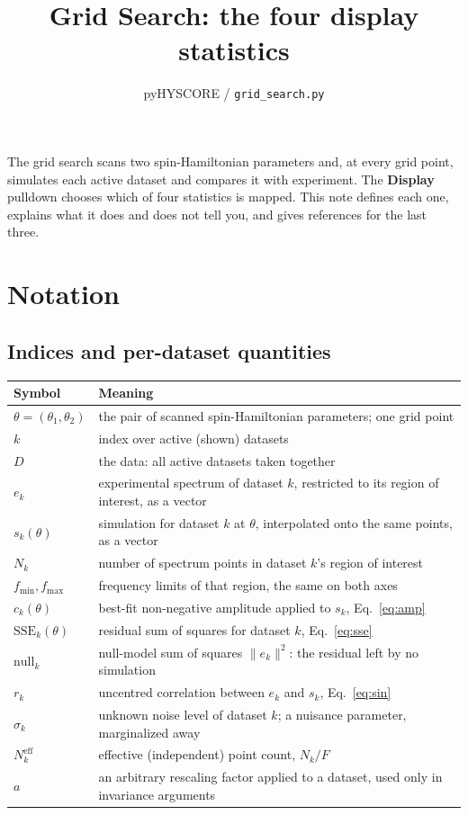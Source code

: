 \documentclass[11pt,a4paper]{article}
\title{Grid Search: the four display statistics}
\author{pyHYSCORE / \texttt{grid\_search.py}}
\date{}
\newcommand{\SSE}{\mathrm{SSE}}
\begin{document}
\maketitle

The grid search scans two spin-Hamiltonian parameters and, at every grid
point, simulates each active dataset and compares it with experiment. The
\textbf{Display} pulldown chooses which of four statistics is mapped. This
note defines each one, explains what it does and does not tell you, and
gives references for the last three.

\tableofcontents

\section{Notation}

\subsection*{Indices and per-dataset quantities}

\begin{tabular}{@{}l p{12.6cm}@{}}
\hline
Symbol & Meaning \\
\hline
$\theta=(\theta_1,\theta_2)$ & the pair of scanned spin-Hamiltonian parameters; one grid point \\
$k$ & index over active (shown) datasets \\
$D$ & the data: all active datasets taken together \\
$e_k$ & experimental spectrum of dataset $k$, restricted to its region of interest, as a vector \\
$s_k(\theta)$ & simulation for dataset $k$ at $\theta$, interpolated onto the same points, as a vector \\
$N_k$ & number of spectrum points in dataset $k$'s region of interest \\
$f_{\min},f_{\max}$ & frequency limits of that region, the same on both axes \\
$c_k(\theta)$ & best-fit non-negative amplitude applied to $s_k$, Eq.\ \eqref{eq:amp} \\
$\SSE_k(\theta)$ & residual sum of squares for dataset $k$, Eq.\ \eqref{eq:sse} \\
$\mathrm{null}_k$ & null-model sum of squares $\lVert e_k\rVert^2$: the residual left by no simulation \\
$r_k$ & uncentred correlation between $e_k$ and $s_k$, Eq.\ \eqref{eq:sin} \\
$\sigma_k$ & unknown noise level of dataset $k$; a nuisance parameter, marginalized away \\
$N_k^{\text{eff}}$ & effective (independent) point count, $N_k/F$ \\
$a$ & an arbitrary rescaling factor applied to a dataset, used only in invariance arguments \\
\hline
\end{tabular}
\end{document}
